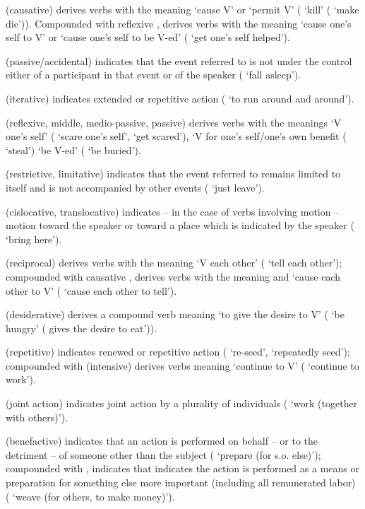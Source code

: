  (causative) derives verbs with the meaning `cause V' or `permit V' ( `kill' (\lit{} `make die')). Compounded with reflexive ,  derives verbs with the meaning `cause one's self to V' or `cause one's self to be V-ed' ( `get one's self helped'). 

 (passive/accidental) indicates that the event referred to is not under the control either of a participant in that event or of the speaker ( `fall asleep').

 (iterative) indicates extended or repetitive action ( `to run around and around').

 (reflexive, middle, medio-passive, passive) derives verbs with the meanings `V one's self' ( `scare one's self', `get scared'), `V for one's self/one's own benefit ( `steal') `be V-ed' ( `be buried'). 

 (restrictive, limitative) indicates that the event referred to remains limited to itself and is not accompanied by other events ( `just leave'). 

 (cislocative, translocative) indicates -- in the case of verbs involving motion -- motion toward the speaker or toward a place which is indicated by the speaker ( `bring here').

 (reciprocal) derives verbs with the meaning `V each other' ( `tell each other'); compounded with causative ,  derives verbs with the meaning and `cause each other to V' ( `cause each other to tell').

 (desiderative) derives a compound verb meaning `to give the desire to V' ( `be hungry' (\lit{} gives the desire to eat')).

 (repetitive) indicates renewed or repetitive action ( `re-seed', `repeatedly seed'); compounded with  (intensive)  derives verbs meaning `continue to V' ( `continue to work').

 (joint action) indicates joint action by a plurality of individuals ( `work (together with others)').

 (benefactive) indicates that an action is performed on behalf -- or to the detriment -- of someone other than the subject ( `prepare (for s.o. else)'); compounded with ,  indicates that indicates the action is performed as a means or preparation for something else more important (including all remunerated labor) ( `weave (for others, to make money)').

